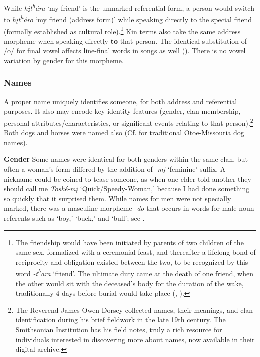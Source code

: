 \documentclass[output=paper]{LSP/langsci}
\begin{document}
While \textit{h\k{i}t\textsuperscript{h}ára} `my friend' is the unmarked referential form, a person would switch to \textit{h\k{i}t\textsuperscript{h}áro} `my friend (address form)' while speaking directly to the special friend (formally established as cultural role).\footnote{The friendship would have been initiated by parents of two children of the same sex, formalized with a ceremonial feast, and thereafter a lifelong bond of reciprocity and obligation existed between the two, to be recognized by this word \textit{-t\textsuperscript{h}ara} `friend'. The ultimate duty came at the death of one friend, when the other would sit with the deceased's body for the duration of the wake, traditionally 4 days before burial would take place (\citealt{Whitman1936}, \citealt{Davidson1997}).}  Kin terms also take the same address morpheme when speaking directly \textbf{to} that person. The identical substitution of /o/ for  final vowel affects line-final words in songs as well (\citealt{Davidson1997}).  There is no vowel variation by gender for this morpheme.         
  
\subsubsection{Names}  A proper name uniquely identifies someone, for both address and referential purposes. It also may encode key identity features (gender, clan membership, personal attributes/characteristics, or significant events relating to that person).\footnote{The Reverend James Owen Dorsey collected names, their meanings, and clan identification during his brief fieldwork in the late 19th century. The Smithsonian Institution has his field notes, truly a rich resource for individuals interested in discovering more about names, now available in their digital archive.}  Both dogs and horses were named also (Cf. \citealt{Whitman1936} for traditional Otoe-Missouria dog names).  

\textbf{Gender} Some names were identical for both genders within the same clan, but often a woman's form differed by the addition of \textit{-m\k{i}} `feminine' suffix.  A nickname could be coined to tease someone, as when one elder told another they should call me \textit{Tosk\'e-m\k{i}} `Quick/Speedy-Woman,' because I had done something so quickly that it surprised them. While names for men were not specially marked, there was a masculine morpheme \textit{-do} that occurs in words for male noun referents such as `boy,' `buck,' and `bull'; see .  
\end{document}
